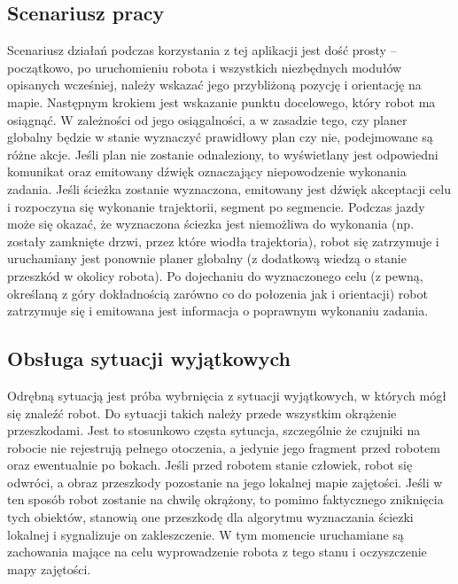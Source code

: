 \subsection{Scenariusz pracy}

Scenariusz działań podczas korzystania z tej aplikacji jest dość prosty -- początkowo,
po uruchomieniu robota i wszystkich niezbędnych modułów opisanych wcześniej, należy
wskazać jego przybliżoną pozycję i orientację na mapie. Następnym krokiem jest
wskazanie punktu docelowego, który robot ma osiągnąć. W zależności od jego osiągalności,
a w zasadzie tego, czy planer globalny będzie w stanie wyznaczyć prawidłowy plan
czy nie, podejmowane są różne akcje. Jeśli plan nie zostanie odnaleziony, to wyświetlany
jest odpowiedni komunikat oraz emitowany dźwięk oznaczający niepowodzenie wykonania
zadania. Jeśli ścieżka zostanie wyznaczona, emitowany jest dźwięk akceptacji celu
i rozpoczyna się wykonanie trajektorii, segment po segmencie. Podczas jazdy może się
okazać, że wyznaczona ściezka jest niemożliwa do wykonania (np. zostały zamknięte
drzwi, przez które wiodła trajektoria), robot się zatrzymuje i uruchamiany jest
ponownie planer globalny (z dodatkową wiedzą o stanie przeszkód w okolicy robota).
Po dojechaniu do wyznaczonego celu (z pewną, określaną z góry dokładnością zarówno
co do połozenia jak i orientacji) robot zatrzymuje się i emitowana jest informacja
o poprawnym wykonaniu zadania.

\subsection{Obsługa sytuacji wyjątkowych}

Odrębną sytuacją jest próba wybrnięcia z sytuacji wyjątkowych, w których mógł się
znaleźć robot. Do sytuacji takich należy przede wszystkim okrążenie przeszkodami.
Jest to stosunkowo częsta sytuacja, szczególnie że czujniki na robocie nie rejestrują
pełnego otoczenia, a jedynie jego fragment przed robotem oraz ewentualnie po bokach.
Jeśli przed robotem stanie człowiek, robot się odwróci, a obraz przeszkody pozostanie
na jego lokalnej mapie zajętości. Jeśli w ten sposób robot zostanie na chwilę okrążony,
to pomimo faktycznego zniknięcia tych obiektów, stanowią one przeszkodę dla algorytmu
wyznaczania ściezki lokalnej i sygnalizuje on zakleszczenie. W tym momencie uruchamiane
są zachowania mające na celu wyprowadzenie robota z tego stanu i oczyszczenie mapy
zajętości.

